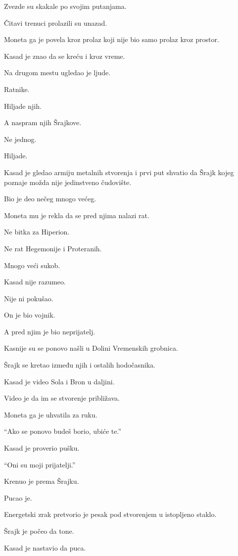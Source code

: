 Zvezde su skakale po svojim putanjama.

Čitavi trenuci prolazili su unazad.

Moneta ga je povela kroz prolaz koji nije bio samo prolaz kroz prostor.

Kasad je znao da se kreću i kroz vreme.

\bigskip

Na drugom mestu ugledao je ljude.

Ratnike.

Hiljade njih.

A naspram njih Šrajkove.

Ne jednog.

Hiljade.

Kasad je gledao armiju metalnih stvorenja i prvi put shvatio da Šrajk kojeg poznaje možda nije jedinstveno čudovište.

Bio je deo nečeg mnogo većeg.

Moneta mu je rekla da se pred njima nalazi rat.

Ne bitka za Hiperion.

Ne rat Hegemonije i Proteranih.

Mnogo veći sukob.

Kasad nije razumeo.

Nije ni pokušao.

On je bio vojnik.

A pred njim je bio neprijatelj.

\bigskip

Kasnije su se ponovo našli u Dolini Vremenskih grobnica.

Šrajk se kretao između njih i ostalih hodočasnika.

Kasad je video Sola i Bron u daljini.

Video je da im se stvorenje približava.

Moneta ga je uhvatila za ruku.

``Ako se ponovo budeš borio, ubiće te.''

Kasad je proverio pušku.

``Oni su moji prijatelji.''

Krenuo je prema Šrajku.

\bigskip

Pucao je.

Energetski zrak pretvorio je pesak pod stvorenjem u istopljeno staklo.

Šrajk je počeo da tone.

Kasad je nastavio da puca.

